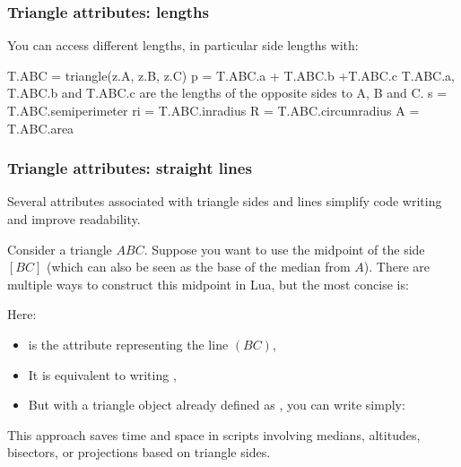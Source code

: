 \subsubsection{Triangle attributes: lengths} %
\label{ssub:triangle_attributes_lengths}

You can access different lengths, in particular side lengths with:
\begin{mybox}
\begin{tkzexample}
  T.ABC = triangle(z.A, z.B, z.C)
  p = T.ABC.a + T.ABC.b +T.ABC.c %
  T.ABC.a, T.ABC.b and T.ABC.c are the lengths of the opposite sides to A, B and C.
  s = T.ABC.semiperimeter
  ri = T.ABC.inradius
  R = T.ABC.circumradius
  A = T.ABC.area
\end{tkzexample}
\end{mybox}

\subsubsection{Triangle attributes: straight lines} %
\label{ssub:triangle_attributes_straight_lines}

Several attributes associated with triangle sides and lines simplify code writing and improve readability.

\medskip
\noindent
Consider a triangle $ABC$. Suppose you want to use the midpoint of the side $[BC]$ (which can also be seen as the base of the median from $A$). There are multiple ways to construct this midpoint in Lua, but the most concise is:

\begin{center}
\end{center}

\noindent
Here:
\begin{itemize}
  \item {} is the attribute representing the line $(BC)$,
  \item It is equivalent to writing ,
  \item But with a triangle object already defined as , you can write simply:
  \begin{center}
  \end{center}
\end{itemize}

\medskip
\noindent
This approach saves time and space in scripts involving medians, altitudes, bisectors, or projections based on triangle sides.

